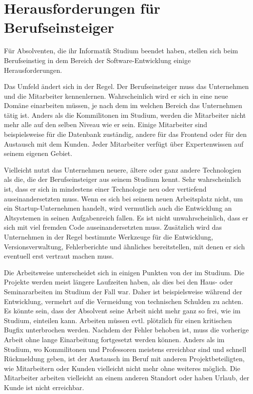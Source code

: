 
\section{Herausforderungen für Berufseinsteiger} \label{sec:Probleme}

Für Absolventen, die ihr Informatik Studium beendet haben, stellen sich beim Berufseinstieg in dem Bereich der Software-Entwicklung einige Herausforderungen.

Das Umfeld ändert sich in der Regel. Der Berufseinsteiger muss das Unternehmen und die Mitarbeiter kennenlernen. Wahrscheinlich wird er sich in eine neue Domäne einarbeiten müssen, je nach dem im welchen Bereich das Unternehmen tätig ist. Anders als die Kommilitonen im Studium, werden die Mitarbeiter nicht mehr alle auf den selben Niveau wie er sein. Einige Mitarbeiter sind beispielsweise für die Datenbank zuständig, andere für das Frontend oder für den Austausch mit dem Kunden. Jeder Mitarbeiter verfügt über Expertenwissen auf seinem eigenen Gebiet.

Vielleicht nutzt das Unternehmen neuere, ältere oder ganz andere Technologien als die, die der Berufseinsteiger aus seinem Studium kennt. Sehr wahrscheinlich ist, dass er sich in mindestens einer Technologie neu oder vertiefend auseinandersetzten muss. Wenn es sich bei seinem neuen Arbeitsplatz nicht, um ein Startup-Unternehmen handelt, wird vermutlich auch die Entwicklung an Altsystemen in seinen Aufgabenreich fallen. Es ist nicht unwahrscheinlich, dass er sich mit viel fremden Code auseinandersetzten muss. Zusätzlich wird das Unternehmen in der Regel bestimmte Werkzeuge für die Entwicklung, Versionsverwaltung, Fehlerberichte und ähnliches bereitstellen, mit denen er sich eventuell erst vertraut machen muss.

Die Arbeitsweise unterscheidet sich in einigen Punkten von der im Studium. Die Projekte werden meist längere Laufzeiten haben, als dies bei den Haus- oder Seminararbeiten im Studium der Fall war. Daher ist beispielsweise während der Entwicklung, vermehrt auf die Vermeidung von technischen Schulden zu achten. Es könnte sein, dass der Absolvent seine Arbeit nicht mehr ganz so frei, wie im Studium, einteilen kann. Arbeiten müssen evtl. plötzlich für einen kritischen Bugfix unterbrochen werden. Nachdem der Fehler behoben ist, muss die vorherige Arbeit ohne lange Einarbeitung fortgesetzt werden können. Anders als im Studium, wo Kommilitonen und Professoren meistens erreichbar sind und schnell Rückmeldung geben, ist der Austausch im Beruf mit anderen Projektbeteiligten, wie Mitarbeitern oder Kunden vielleicht nicht mehr ohne weiteres möglich. Die Mitarbeiter arbeiten vielleicht an einem anderen Standort oder haben Urlaub, der Kunde ist nicht erreichbar.


